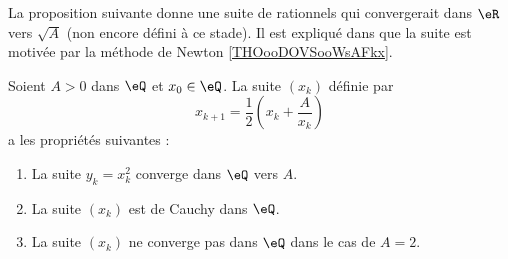 La proposition suivante donne une suite de rationnels qui convergerait dans \( \eR\) vers \( \sqrt{ A }\) (non encore défini à ce stade). Il est expliqué dans \cite{BIBooMPXEooQLKhku} que la suite est motivée par la méthode de Newton \ref{THOooDOVSooWsAFkx}.
\begin{proposition}       \label{PROPooSTQXooHlIGVf}
    Soient \( A>0\) dans \( \eQ\) et \( x_0\in \eQ\). La suite \( (x_k)\) définie par
    \begin{equation}
        x_{k+1}=\frac{ 1 }{2}\left( x_k+\frac{ A }{ x_k } \right)
    \end{equation}
    a les propriétés suivantes :
    \begin{enumerate}
        \item
            La suite \( y_k=x_k^2 \) converge dans \( \eQ\) vers \( A\).
        \item
            La suite \( (x_k)\) est de Cauchy dans \( \eQ\).
        \item
            La suite \( (x_k)\) ne converge pas dans \( \eQ\) dans le cas de \( A=2\).
    \end{enumerate}
\end{proposition}

